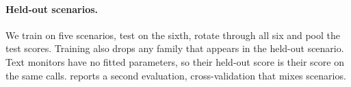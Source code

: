 \paragraph{Held-out scenarios.}
We train on five scenarios, test on the sixth, rotate through all six and pool the test scores.
Training also drops any family that appears in the held-out scenario.
Text monitors have no fitted parameters, so their held-out score is their score on the same calls.
 reports a second evaluation, cross-validation that mixes scenarios.
